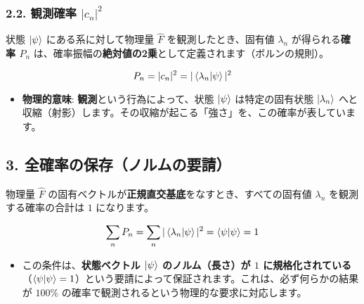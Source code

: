 \documentclass{ltjsarticle}
\begin{document}
\subsubsection*{2.2. 観測確率 $|c_n|^2$}

状態 $\ket{\psi}$ にある系に対して物理量 $\hat{F}$ を観測したとき、固有値 $\lambda_n$ が得られる\textbf{確率 $P_n$} は、確率振幅の\textbf{絶対値の2乗}として定義されます（ボルンの規則）。

\[
P_n = |c_n|^2 = |\braket{\lambda_n|\psi}|^2
\]

\begin{itemize}
    \item \textbf{物理的意味}: \textbf{観測}という行為によって、状態 $\ket{\psi}$ は特定の固有状態 $\ket{\lambda_n}$ へと収縮（射影）します。その収縮が起こる「強さ」を、この確率が表しています。
\end{itemize}

\subsection*{3. 全確率の保存（ノルムの要請）}

物理量 $\hat{F}$ の固有ベクトルが\textbf{正規直交基底}をなすとき、すべての固有値 $\lambda_n$ を観測する確率の合計は $1$ になります。

\[
\sum_{n} P_n = \sum_{n} |\braket{\lambda_n|\psi}|^2 = \braket{\psi|\psi} = 1
\]

\begin{itemize}
    \item この条件は、\textbf{状態ベクトル $\ket{\psi}$ のノルム（長さ）が $1$ に規格化されている}（$\braket{\psi|\psi}=1$）という要請によって保証されます。これは、必ず何らかの結果が $100\%$ の確率で観測されるという物理的な要求に対応します。
\end{itemize}
\end{document}
